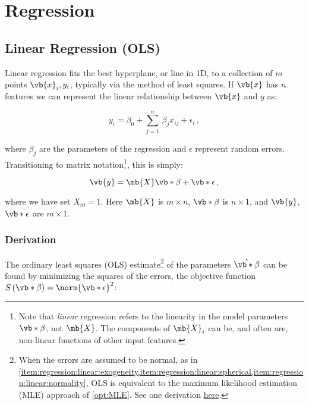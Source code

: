\chapter{Regression}
\label{chap:regression}

\section{Linear Regression (OLS)}
\label{regression:linear}

Linear regression fits the best hyperplane, or line in 1D,
to a collection of $m$ points $\vb{x}_{i}, y_{i}$,
typically via the method of least squares.
If $\vb{x}$ has $n$ features we can represent the
linear relationship between $\vb{x}$ and $y$ as:

\begin{equation}\label{eq:linear:one_point}
y_{i} = \beta_{0} + \sum_{j=1}^{n}\, \beta_{j} x_{ij} + \epsilon_{i}\,,
\end{equation}

\noindent where $\beta_{j}$ are the parameters of the regression
and $\epsilon$ represent random errors.
Transitioning to matrix notation\footnote{Note
that \textit{linear} regression refers to the linearity in the model parameters
$\vb*{\beta}$, not $\mb{X}$.
The components of $\mb{X}_{i}$ can be, and often are,
non-linear functions of other input features.}, this is simply:

\begin{equation}\label{eq:linear:matrix}
\vb{y} = \mb{X} \vb*{\beta} + \vb*{\epsilon}\,,
\end{equation}

\noindent where we have set $X_{i0} =1$.
Here $\mb{X}$ is $m \times n$,
$\vb*{\beta}$ is $n \times 1$,
and $\vb{y}$, $\vb*{\epsilon}$ are $m \times 1$.

\subsection{Derivation}
\label{regression:linear:derivation}

The ordinary least squares (OLS) estimate\footnote{When
the errors are assumed to be normal,
as in \cref{item:regression:linear:exogeneity,item:regression:linear:spherical,item:regression:linear:normality},
OLS is equivalent to the maximum likelihood estimation (MLE) approach of \cref{opt:MLE}.
See one derivation \href{https://machinelearningmastery.com/linear-regression-with-maximum-likelihood-estimation/}{here}.} of
the parameters $\hat{\vb*{\beta}}$
can be found by minimizing the squares of the errors,
\ie the objective function $S\left(\vb*{\beta}\right) = \norm{\vb*{\epsilon}}^{2}$:

